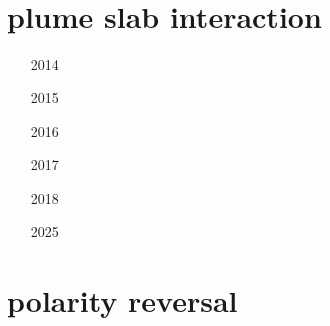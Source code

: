\begin{small}
\begin{itemize}
 \\ 
 \\ 
 \\ 
 \\ 
\item[\twothousandtwentyfour]
 \\
 \\
\item[\twothousandtwentyfive]
 \\
 \\
\end{itemize}
\end{small}

\section{plume slab interaction}

\begin{small}
\begin{itemize}
\item[2014]
\item[2015]
 \\
\item[2016] 
\item[2017]
\item[2018]
\item[2025]
\end{itemize}
\end{small}

\section{polarity reversal}

